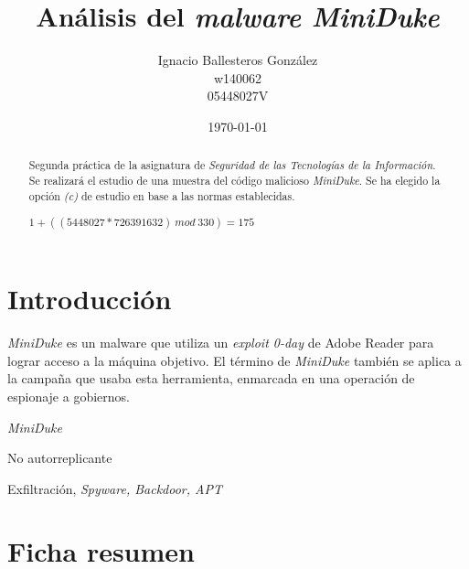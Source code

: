 \documentclass[11pt,a4paper]{article}
\title{Análisis del \emph{malware MiniDuke}}
\author{\begin{tabular}[center]{c}
          Ignacio Ballesteros González \\
          \small w140062 \\
          \small 05448027V \\
        \end{tabular}
      }
\date{\today}
\begin{document}
\maketitle
\tableofcontents
\normalsize
\begin{abstract}
  Segunda práctica de la asignatura de \emph{Seguridad de las
    Tecnologías de la Información}. Se realizará el estudio de una
  muestra del código malicioso \emph{MiniDuke}. Se ha elegido la
  opción \textit{(c)} de estudio en base a las normas establecidas.

  \begin{center}
    $1 + ((5448027 * 726391632)~mod~330) = 175$
  \end{center}
\end{abstract}

\section{Introducción}
\label{sec:intro}
\emph{MiniDuke} es un malware que utiliza un \emph{exploit 0-day} de Adobe
Reader para lograr acceso a la máquina objetivo. El término de
\emph{MiniDuke} también se aplica a la campaña que usaba esta
herramienta, enmarcada en una operación de espionaje a gobiernos. \cite{Dukes}

\begin{description}[leftmargin=9em,style=nextline]
  \item[Código malicioso] \emph{MiniDuke}
  \item[Tipo] No autorreplicante
  \item[Familia] Exfiltración, \emph{Spyware, Backdoor, APT}
\end{description}

\section{Ficha resumen}
\end{document}
